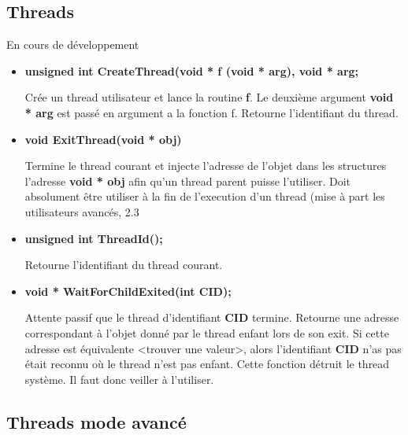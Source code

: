 \documentclass{article}
\begin{document}
\subsection{Threads}
En cours de développement
\begin{itemize}

    \item 
    \textbf{unsigned int CreateThread(void * f (void * arg), void * arg;}
    
    Crée un thread utilisateur et lance la routine \textbf{f}. Le deuxième argument 
    \textbf{void * arg} est passé en argument a la fonction f.
    Retourne l'identifiant du thread.
   
   \item 
   \textbf{void ExitThread(void * obj)} 
   
   Termine le thread courant et injecte l'adresse de l'objet dans les structures l'adresse \textbf{void * obj} afin qu'un thread parent puisse l'utiliser. Doit absolument être utiliser à la fin de l'execution d'un thread (mise à part les utilisateurs avancés, 2.3
   
   \item 
   \textbf{unsigned int ThreadId();}
   
	Retourne l'identifiant du thread courant.   
   
   \item
   \textbf{void * WaitForChildExited(int CID);} 
   
   Attente passif que le thread d'identifiant \textbf{CID} termine. Retourne une adresse correspondant à l'objet donné par le thread enfant lors de son exit. Si cette adresse est équivalente <trouver une valeur>, alors l'identifiant \textbf{CID} n'as pas était reconnu où le thread n'est pas enfant.
   Cette fonction détruit le thread système. Il faut donc veiller à l'utiliser.
   
    
\end{itemize}

\subsection{Threads mode avancé}
\end{document}
